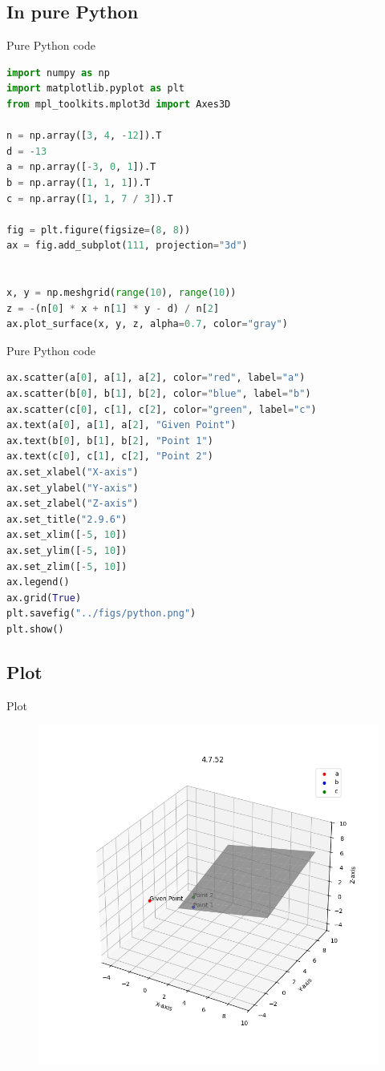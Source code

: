 \documentclass{beamer}
\theoremstyle{remark}
\numberwithin{equation}{section}
\begin{document}
\subsection{In pure Python}
\begin{frame}[fragile]{Pure Python code}
 \begin{lstlisting}[language=Python]
import numpy as np
import matplotlib.pyplot as plt
from mpl_toolkits.mplot3d import Axes3D

n = np.array([3, 4, -12]).T
d = -13
a = np.array([-3, 0, 1]).T
b = np.array([1, 1, 1]).T
c = np.array([1, 1, 7 / 3]).T

fig = plt.figure(figsize=(8, 8))
ax = fig.add_subplot(111, projection="3d")


x, y = np.meshgrid(range(10), range(10))
z = -(n[0] * x + n[1] * y - d) / n[2]
ax.plot_surface(x, y, z, alpha=0.7, color="gray")

 \end{lstlisting}
\end{frame}
\begin{frame}[fragile]{Pure Python code}
 \begin{lstlisting}[language=Python]
ax.scatter(a[0], a[1], a[2], color="red", label="a")
ax.scatter(b[0], b[1], b[2], color="blue", label="b")
ax.scatter(c[0], c[1], c[2], color="green", label="c")
ax.text(a[0], a[1], a[2], "Given Point")
ax.text(b[0], b[1], b[2], "Point 1")
ax.text(c[0], c[1], c[2], "Point 2")
ax.set_xlabel("X-axis")
ax.set_ylabel("Y-axis")
ax.set_zlabel("Z-axis")
ax.set_title("2.9.6")
ax.set_xlim([-5, 10])
ax.set_ylim([-5, 10])
ax.set_zlim([-5, 10])
ax.legend()
ax.grid(True)
plt.savefig("../figs/python.png")
plt.show()
 \end{lstlisting}
\end{frame}
\subsection{Plot}
\begin{frame}{Plot}
 \begin{figure}[H]
    \centering
    \includegraphics[width=0.75\columnwidth]{../figs/python.png}
    \caption*{}
    \label{fig:plot}
\end{figure}
\end{frame}
\end{document}

